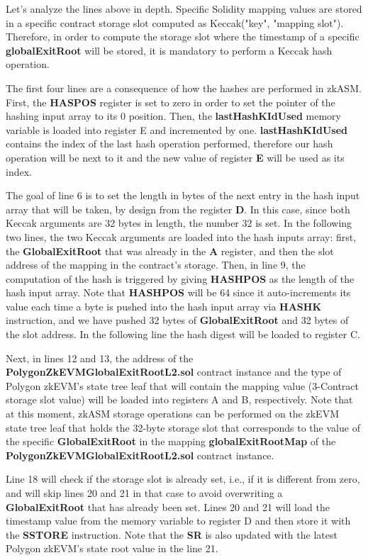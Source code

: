Let's analyze the lines above in depth. Specific Solidity mapping values are stored in a specific contract storage slot computed as Keccak("key", "mapping slot"). Therefore, in order to compute the storage slot where the timestamp of a specific \textbf{globalExitRoot} will be stored, it is mandatory to perform a Keccak hash operation.

The first four lines are a consequence of how the hashes are performed in zkASM. First, the \textbf{HASPOS} register is set to zero in order to set the pointer of the hashing input array to its 0 position. Then, the \textbf{lastHashKIdUsed} memory variable is loaded into register E and incremented by one. \textbf{lastHashKIdUsed} contains the index of the last hash operation performed, therefore our hash operation will be next to it and the new value of register \textbf{E} will be used as its index.

The goal of line 6 is to set the length in bytes of the next entry in the hash input array that will be taken, by design from the register \textbf{D}. In this case, since both Keccak arguments are 32 bytes in length, the number 32 is set. In the following two lines, the two Keccak arguments are loaded into the hash inputs array: first, the \textbf{GlobalExitRoot} that was already in the \textbf{A} register, and then the slot address of the mapping in the contract's storage. Then, in line 9, the computation of the hash is triggered by giving \textbf{HASHPOS} as the length of the hash input array. Note that \textbf{HASHPOS} will be 64 since it auto-increments its value each time a byte is pushed into the hash input array via \textbf{HASHK} instruction, and we have pushed 32 bytes of \textbf{GlobalExitRoot} and 32 bytes of the slot address. In the following line the hash digest will be loaded to register C.

Next, in lines 12 and 13, the address of the \textbf{PolygonZkEVMGlobalExitRootL2.sol} contract instance and the type of Polygon zkEVM's state tree leaf that will contain the mapping value (3-Contract storage slot value) will be loaded into registers A and B, respectively. Note that at this moment, zkASM storage operations can be performed on the zkEVM state tree leaf that holds the 32-byte storage slot that corresponds to the value of the specific \textbf{GlobalExitRoot} in the mapping \textbf{globalExitRootMap} of the \textbf{PolygonZkEVMGlobalExitRootL2.sol} contract instance.

Line 18 will check if the storage slot is already set, i.e., if it is different from zero, and will skip lines 20 and 21 in that case to avoid overwriting a \textbf{GlobalExitRoot} that has already been set. Lines 20 and 21 will load the timestamp value from the memory variable to register D and then store it with the \textbf{SSTORE} instruction. Note that the \textbf{SR} is also updated with the latest Polygon zkEVM's state root value in the line 21.

